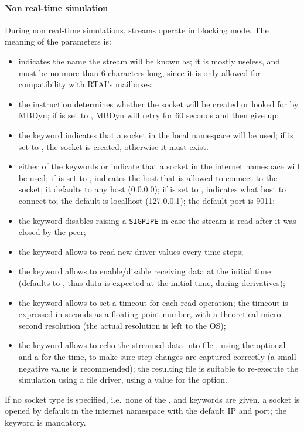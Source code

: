 \paragraph{Non real-time simulation}
During non real-time simulations, streams operate in blocking mode.
The meaning of the parameters is:
\begin{itemize}
\item {} indicates the name the stream will be known as;
it is mostly useless, and must be no more than 6 characters long,
since it is only allowed for compatibility with RTAI's mailboxes;
\item the instruction  determines whether the socket will be
created or looked for by MBDyn; if  is set to ,
MBDyn will retry for 60 seconds and then give up;
\item the keyword  indicates that a socket 
in the local namespace will be used; if  is set to ,
the socket is created, otherwise it must exist.
\item either of the keywords  or  indicate that a socket
in the internet namespace will be used;
if  is set to ,  indicates 
the host that is allowed to connect to the socket; it defaults 
to any host (0.0.0.0); if  is set to ,
 indicates what host to connect to; the default 
is localhost (127.0.0.1); the default port is 9011;
\item the keyword  disables raising a \texttt{SIGPIPE}
in case the stream is read after it was closed by the peer;
\item the keyword  allows to read new driver values
every  time steps;
\item the keyword  allows to enable/disable
receiving data at the initial time (defaults to ,
thus data is expected at the initial time, during derivatives);
\item the keyword  allows to set a timeout
for each read operation; the timeout is expressed in seconds
as a floating point number, with a theoretical micro-second resolution
(the actual resolution is left to the OS);
\item the keyword  allows to echo the streamed data
into file , using the optional 
and a  for the time, to make sure step changes are captured
correctly (a small negative value is recommended);
the resulting file is suitable to re-execute the simulation
using a  file driver, using a  value
for the  option.
\end{itemize}
If no socket type is specified, i.e.\ none of the ,  
and  keywords are given, a socket is opened by default 
in the internet namespace with the default IP and port; the 
keyword is mandatory.

